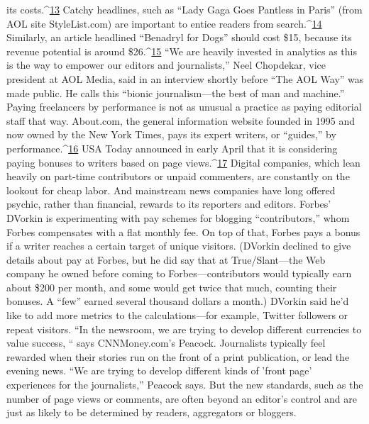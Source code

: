 its costs.^{\href{#endnotes-chapter-9}{13}} Catchy headlines, such as ``Lady Gaga Goes Pantless in Paris'' (from
AOL site StyleList.com) are important to entice readers from search.^{\href{#endnotes-chapter-9}{14}} Similarly,
an article headlined ``Benadryl for Dogs'' should cost \$15, because its revenue
potential is around \$26.^{\href{#endnotes-chapter-9}{15}} ``We are heavily invested in analytics as this is the way
to empower our editors and journalists,'' Neel Chopdekar, vice president at AOL
Media, said in an interview shortly before ``The AOL Way'' was made public. He
calls this ``bionic journalism—the best of man and machine.''
Paying freelancers by performance is not as unusual a practice as paying editorial
staff that way. About.com, the general information website founded in 1995
and now owned by the New York Times, pays its expert writers, or ``guides,'' by
performance.^{\href{#endnotes-chapter-9}{16}} USA Today announced in early April that it is considering paying
bonuses to writers based on page views.^{\href{#endnotes-chapter-9}{17}}
Digital companies, which lean heavily on part-time contributors or unpaid
commenters, are constantly on the lookout for cheap labor. And mainstream
news companies have long offered psychic, rather than financial, rewards to its
reporters and editors.
Forbes' DVorkin is experimenting with pay schemes for blogging ``contributors,''
whom Forbes compensates with a flat monthly fee. On top of that, Forbes
pays a bonus if a writer reaches a certain target of unique visitors. (DVorkin declined
to give details about pay at Forbes, but he did say that at True/Slant—the
Web company he owned before coming to Forbes—contributors would typically
earn about \$200 per month, and some would get twice that much, counting
their bonuses. A ``few'' earned several thousand dollars a month.) DVorkin said
he'd like to add more metrics to the calculations—for example, Twitter followers
or repeat visitors.
``In the newsroom, we are trying to develop different currencies to value success,
“ says CNNMoney.com's Peacock. Journalists typically feel rewarded when
their stories run on the front of a print publication, or lead the evening news.
“We are trying to develop different kinds of 'front page' experiences for the
journalists,'' Peacock says. But the new standards, such as the number of page
views or comments, are often beyond an editor's control and are just as likely to
be determined by readers, aggregators or bloggers.

